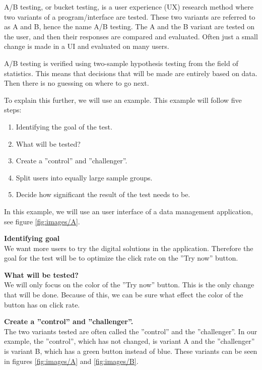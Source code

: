 
A/B testing, or bucket testing, is a user experience (UX) research method where two variants of a program/interface are tested. These two variants are referred to as A and B, hence the name A/B testing. The A and the B variant are tested on the user, and then their responses are compared and evaluated. Often just a small change is made in a UI and evaluated on many users. 

A/B testing is verified using two-sample hypothesis testing from the field of statistics. This means that decisions that will be made are entirely based on data. Then there is no guessing on where to go next.

To explain this further, we will use an example.
This example will follow five steps: 
\begin{enumerate}
  \item Identifying the goal of the test. 
  \item What will be tested? 
 \item Create a ''control'' and ''challenger''. 
 \item Split users into equally large sample groups.
 \item Decide how significant the result of the test needs to be.
\end{enumerate}
 
In this example, we will use an user interface of a data management application, see figure \ref{fig:images/A}. 

\textbf{Identifying goal} \\
We want more users to try the digital solutions in the application. Therefore the goal for the test will be to optimize the click rate on the ''Try now'' button.

\textbf{What will be tested?}\\
We will only focus on the color of the ''Try now'' button. This is the only change that will be done. Because of this, we can be sure what effect the color of the button has on click rate. 

\textbf{Create a ''control'' and ''challenger''. }\\
The two variants tested are often called the ''control'' and the ''challenger''. In our example, the ''control'', which has not changed, is variant A and the ''challenger'' is variant B, which has a green button instead of blue. These variants can be seen in figures \ref{fig:images/A} and \ref{fig:images/B}.

